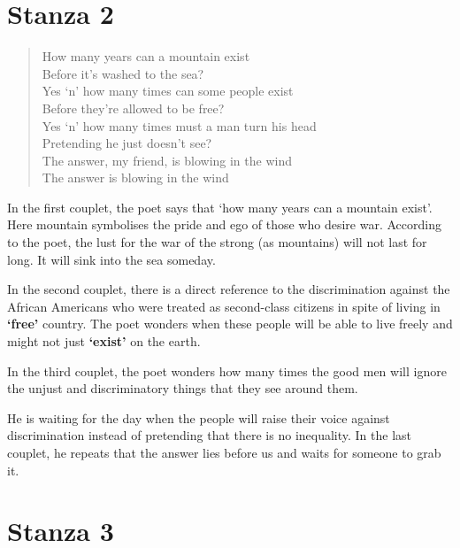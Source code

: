 \documentclass[a4paper,12pt]{book}
\begin{document}
\section{Stanza 2}
\label{sec:org9e48eed}

\begin{verse}
How many years can a mountain exist\\[0pt]
Before it’s washed to the sea?\\[0pt]
Yes ‘n’ how many times can some people exist\\[0pt]
Before they’re allowed to be free?\\[0pt]
Yes ‘n’ how many times must a man turn his head\\[0pt]
Pretending he just doesn’t see?\\[0pt]
The answer, my friend, is blowing in the wind\\[0pt]
The answer is blowing in the wind\\[0pt]
\end{verse}

In the first couplet, the poet says that ‘how many years can a mountain exist’. Here mountain symbolises the pride and ego of those who desire war. According to the poet, the lust for the war of the strong (as mountains) will not last for long. It will sink into the sea someday.

In the second couplet, there is a direct reference to the discrimination against the African Americans who were treated as second-class citizens in spite of living in \textbf{‘free’} country. The poet wonders when these people will be able to live freely and might not just \textbf{‘exist’} on the earth.

In the third couplet, the poet wonders how many times the good men will ignore the unjust and discriminatory things that they see around them.

He is waiting for the day when the people will raise their voice against discrimination instead of pretending that there is no inequality. In the last couplet, he repeats that the answer lies before us and waits for someone to grab it.

\section{Stanza 3}
\label{sec:org3b57396}
\end{document}
